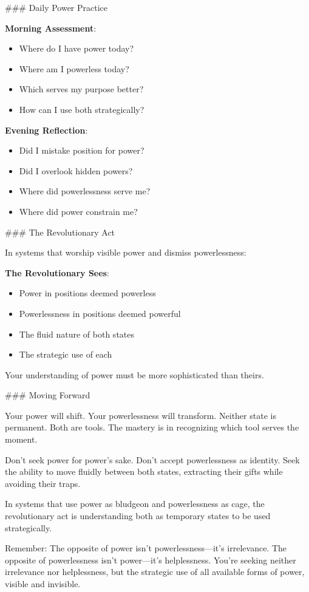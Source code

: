 \documentclass[12pt]{book}
\begin{document}
\#\#\# Daily Power Practice

\textbf{Morning Assessment}:
\begin{itemize}
\item Where do I have power today?
\item Where am I powerless today?
\item Which serves my purpose better?
\item How can I use both strategically?

\end{itemize}
\textbf{Evening Reflection}:
\begin{itemize}
\item Did I mistake position for power?
\item Did I overlook hidden powers?
\item Where did powerlessness serve me?
\item Where did power constrain me?

\end{itemize}
\#\#\# The Revolutionary Act

In systems that worship visible power and dismiss powerlessness:

\textbf{The Revolutionary Sees}:
\begin{itemize}
\item Power in positions deemed powerless
\item Powerlessness in positions deemed powerful
\item The fluid nature of both states
\item The strategic use of each

\end{itemize}
Your understanding of power must be more sophisticated than theirs.

\#\#\# Moving Forward

Your power will shift. Your powerlessness will transform. Neither state is permanent. Both are tools. The mastery is in recognizing which tool serves the moment.

Don't seek power for power's sake. Don't accept powerlessness as identity. Seek the ability to move fluidly between both states, extracting their gifts while avoiding their traps.

In systems that use power as bludgeon and powerlessness as cage, the revolutionary act is understanding both as temporary states to be used strategically.

Remember: The opposite of power isn't powerlessness—it's irrelevance. The opposite of powerlessness isn't power—it's helplessness. You're seeking neither irrelevance nor helplessness, but the strategic use of all available forms of power, visible and invisible.
\end{document}
